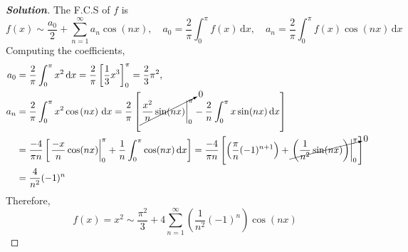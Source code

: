 \documentclass[a4paper,12pt]{article} %
\theoremstyle{plain}
\begin{document}
\begin{proof}[\textbf{Solution}]
    The F.C.S of $f$ is \begin{equation*}
        f(x) \sim \frac{a_0}2 + \sum_{n=1}^\infty a_n \cos \left(nx\right),
        \quad 
        a_0 = \frac{2}{\pi} \int_0^\pi f(x) \, \mathrm dx, \quad
        a_n = \frac{2}{\pi} \int_0^\pi f(x) \cos \left(nx\right) \, \mathrm dx
    \end{equation*}
    Computing the coefficients,
    \begin{align*}
        a_0 &= \frac{2}{\pi} \int_0^\pi x^2 \, \mathrm dx = \frac{2}{\pi} \left[ \frac{1}{3}x^3\right]_0^\pi = \frac{2}{3}\pi^2,\\
        a_n &= \frac{2}{\pi} \int_0^\pi x^2 \cos \left(nx\right) \, \mathrm dx
            = \frac{2}{\pi} \left[ \cancelto{0}{\left.\frac{x^2}{n}\sin(nx)\right|_0^\pi } - \frac{2}{n} \int_0^\pi x \sin (nx)\,\mathrm dx \right] \\
            &=\frac{-4}{\pi n} \left[ \left.\frac{-x}{n}\cos(n x) \right|_0^\pi+ \frac{1}{n} \int_0^\pi  \cos (nx)\,\mathrm dx \right]
            = \frac{-4}{\pi n} \left[ \left(\frac{\pi}{n}(-1)^{n+1}\right) + \cancelto{0}{\left.\left(\frac{1}{n^2}\sin(nx) \right)\right|_0^\pi} \right]\\
            &=\frac{4}{n^2}(-1)^{n}
    \end{align*}
    Therefore, 
    \begin{equation*}
        f(x) = x^2 \sim  \frac{\pi^2}{3} + 4\sum_{n=1}^\infty \left(\frac{1}{n^2 }(-1)^n\right)\cos(nx)
    \end{equation*}
    

\end{proof}
\end{document}
